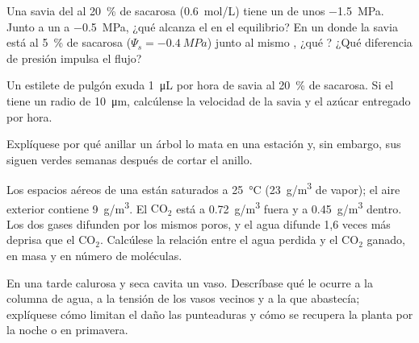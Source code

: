 \begin{exercise}[$\star\star$]\label{exo:b1:plant-transport:7}
Una savia del  al \qty{20}{\%} de sacarosa (\qty{0.6}{mol/L}) tiene un
 de unos \qty{-1.5}{MPa}. Junto a un  a
\qty{-0.5}{MPa}, ¿qué  alcanza el  en el equilibrio? En
un  donde la savia está al \qty{5}{\%} de sacarosa ($\Psi_s = \qty{-0.4}{MPa}$) junto al mismo , ¿qué ? ¿Qué diferencia de
presión impulsa el flujo?
\end{exercise}

\begin{exercise}[$\star\star$]\label{exo:b1:plant-transport:8}
Un estilete de pulgón exuda \qty{1}{\micro L} por hora de savia al
\qty{20}{\%} de sacarosa. Si el  tiene un radio de
\qty{10}{\micro m}, calcúlense la velocidad de la savia y el azúcar
entregado por hora.
\end{exercise}

\begin{exercise}[$\star\star$]\label{exo:b1:plant-transport:9}
Explíquese por qué anillar un árbol lo mata en una estación y, sin embargo,
sus  siguen verdes semanas después de cortar el anillo.
\end{exercise}

\begin{exercise}[$\star\star\star$]\label{exo:b1:plant-transport:10}
Los espacios aéreos de una  están saturados a \qty{25}{\celsius}
(\qty{23}{g/m^3} de vapor); el aire exterior contiene \qty{9}{g/m^3}. El
$\mathrm{CO_2}$ está a \qty{0.72}{g/m^3} fuera y a \qty{0.45}{g/m^3} dentro.
Los dos gases difunden por los mismos poros, y el agua difunde 1,6 veces más
deprisa que el $\mathrm{CO_2}$. Calcúlese la relación entre el agua perdida
y el $\mathrm{CO_2}$ ganado, en masa y en número de moléculas.
\end{exercise}

\begin{exercise}[$\star\star\star$]\label{exo:b1:plant-transport:11}
En una tarde calurosa y seca cavita un vaso. Descríbase qué le ocurre a la
columna de agua, a la tensión de los vasos vecinos y a la  que
abastecía; explíquese cómo limitan el daño las punteaduras y cómo se
recupera la planta por la noche o en primavera.
\end{exercise}

